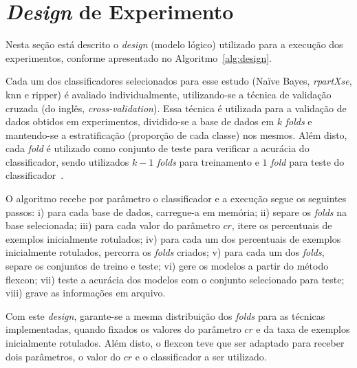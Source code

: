 \section{\textit{Design} de Experimento}
    \label{sec:design-experimento}

    Nesta seção está descrito o \textit{design} (modelo lógico) utilizado para a execução dos experimentos, conforme apresentado no Algoritmo~\ref{alg:design}.
    
    Cada um dos classificadores selecionados para esse estudo (Naïve Bayes, \textit{rpartXse}, \ac{knn} e \ac{ripper}) é avaliado individualmente, utilizando\hyp{se} a técnica de validação cruzada (do inglês, \textit{cross\hyp{validation}}). Essa técnica é utilizada para a validação de dados obtidos em experimentos, dividido\hyp{se} a base de dados em $k$ \textit{folds} e mantendo\hyp{se} a estratificação (proporção de cada classe) nos mesmos. Além disto, cada \textit{fold} é utilizado como conjunto de teste para verificar a acurácia do classificador, sendo utilizados $k - 1$ \textit{folds} para treinamento e $1$ \textit{fold} para teste do classificador~\cite{wong2015cross}.
    
    O algoritmo recebe por parâmetro o classificador e a execução segue os seguintes passos: i) para cada base de dados, carregue\hyp{a} em memória; ii) separe os \textit{folds} na base selecionada; iii) para cada valor do parâmetro $cr$, itere os percentuais de exemplos inicialmente rotulados; iv) para cada um dos percentuais de exemplos inicialmente rotulados, percorra os \textit{folds} criados; v) para cada um dos \textit{folds}, separe os conjuntos de treino e teste; vi) gere os modelos a partir do método \ac{flexcon}; vii) teste a acurácia dos modelos com o conjunto selecionado para teste; viii) grave as informações em arquivo.
    
    Com este \textit{design}, garante\hyp{se} a mesma distribuição dos \textit{folds} para as técnicas implementadas, quando fixados os valores do parâmetro $cr$ e da taxa de exemplos inicialmente rotulados. Além disto, o \ac{flexcon} teve que ser adaptado para receber dois parâmetros, o valor do $cr$ e o classificador a ser utilizado.


